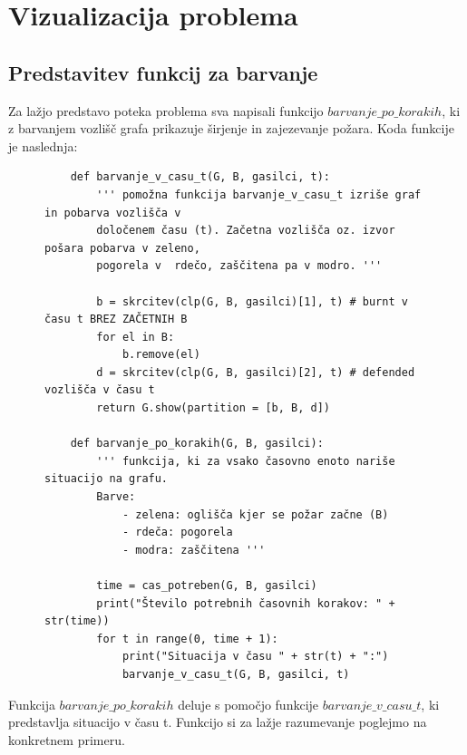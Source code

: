 \documentclass[a4paper, 12pt]{article}
\begin{document}
\pagebreak


\section{Vizualizacija problema}

\subsection{Predstavitev funkcij za barvanje}

\noindent Za lažjo predstavo poteka problema sva napisali funkcijo $barvanje\_po\_korakih$, ki z barvanjem
vozlišč grafa prikazuje širjenje in zajezevanje požara. Koda funkcije je naslednja:

\begin{figure}[h]
\scriptsize
\begin{verbatim}
    def barvanje_v_casu_t(G, B, gasilci, t):
        ''' pomožna funkcija barvanje_v_casu_t izriše graf in pobarva vozlišča v 
        določenem času (t). Začetna vozlišča oz. izvor pošara pobarva v zeleno, 
        pogorela v  rdečo, zaščitena pa v modro. '''

        b = skrcitev(clp(G, B, gasilci)[1], t) # burnt v času t BREZ ZAČETNIH B
        for el in B:
            b.remove(el)
        d = skrcitev(clp(G, B, gasilci)[2], t) # defended vozlišča v času t
        return G.show(partition = [b, B, d])

    def barvanje_po_korakih(G, B, gasilci):
        ''' funkcija, ki za vsako časovno enoto nariše situacijo na grafu.
        Barve:
            - zelena: oglišča kjer se požar začne (B)
            - rdeča: pogorela
            - modra: zaščitena '''

        time = cas_potreben(G, B, gasilci)
        print("Število potrebnih časovnih korakov: " + str(time))
        for t in range(0, time + 1):
            print("Situacija v času " + str(t) + ":")
            barvanje_v_casu_t(G, B, gasilci, t) 
\end{verbatim}
\end{figure}

\noindent Funkcija $barvanje\_po\_korakih$ deluje s pomočjo funkcije $barvanje\_v\_casu\_t$, ki predstavlja
situacijo v času t. Funkcijo si za lažje razumevanje poglejmo na konkretnem primeru.
\end{document}
